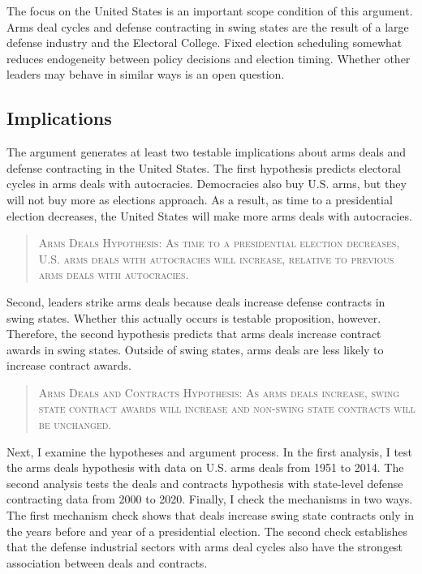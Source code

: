 \documentclass[12pt]{article}
\begin{document}
The focus on the United States is an important scope condition of this argument.
Arms deal cycles and defense contracting in swing states are the result of a large defense industry and the Electoral College. 
Fixed election scheduling somewhat reduces endogeneity between policy decisions and election timing. 
Whether other leaders may behave in similar ways is an open question. 



\subsection{Implications}


The argument generates at least two testable implications about arms deals and defense contracting in the United States. 
The first hypothesis predicts electoral cycles in arms deals with autocracies.
Democracies also buy U.S. arms, but they will not buy more as elections approach. 
As a result, as time to a presidential election decreases, the United States will make more arms deals with autocracies. 


\begin{quote}
\textsc{Arms Deals Hypothesis: As time to a presidential election decreases, U.S. arms deals with autocracies will increase, relative to previous arms deals with autocracies.}
\end{quote}


Second, leaders strike arms deals because deals increase defense contracts in swing states.
Whether this actually occurs is testable proposition, however. 
Therefore, the second hypothesis predicts that arms deals increase contract awards in swing states.
Outside of swing states, arms deals are less likely to increase contract awards. 


\begin{quote}
\textsc{Arms Deals and Contracts Hypothesis: As arms deals increase, swing state contract awards will increase and non-swing state contracts will be unchanged.}
\end{quote}


Next, I examine the hypotheses and argument process. 
In the first analysis, I test the arms deals hypothesis with data on U.S. arms deals from 1951 to 2014.  
The second analysis tests the deals and contracts hypothesis with state-level defense contracting data from 2000 to 2020. 
Finally, I check the mechanisms in two ways.
The first mechanism check shows that deals increase swing state contracts only in the years before and year of a presidential election. 
The second check establishes that the defense industrial sectors with arms deal cycles also have the strongest association between deals and contracts. 
\end{document}
